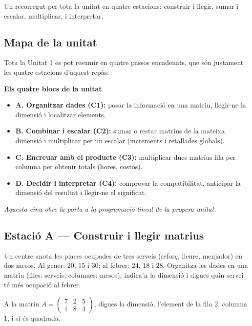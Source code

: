 %
{Un recorregut per tota la unitat en quatre estacions: construir i llegir, sumar i escalar, multiplicar, i interpretar.}

\subsection{Mapa de la unitat}

Tota la Unitat 1 es pot resumir en quatre passos encadenats, que són justament les
quatre estacions d'aquest repàs:

\begin{idea}
\textbf{Els quatre blocs de la unitat}
\begin{itemize}[leftmargin=1.4em, itemsep=2pt]
  \item \textbf{A. Organitzar dades (C1):} posar la informació en una matriu,
        llegir-ne la dimensió i localitzar elements.
  \item \textbf{B. Combinar i escalar (C2):} sumar o restar matrius de la mateixa
        dimensió i multiplicar per un escalar (increments i retallades globals).
  \item \textbf{C. Encreuar amb el producte (C3):} multiplicar dues matrius fila
        per columna per obtenir totals (hores, costos).
  \item \textbf{D. Decidir i interpretar (C4):} comprovar la compatibilitat,
        anticipar la dimensió del resultat i llegir-ne el significat.
\end{itemize}
\textit{Aquesta eina obre la porta a la programació lineal de la propera unitat.}
\end{idea}

\subsection{Estació A — Construir i llegir matrius}

\begin{exercicis}[Estació A]
\begin{exlist}
  \item Un centre anota les places ocupades de tres serveis (reforç, lleure,
        menjador) en dos mesos. Al gener: $20$, $15$ i $30$; al febrer: $24$, $18$
        i $28$. Organitza les dades en una matriu (files: serveis; columnes: mesos),
        indica'n la dimensió i digues quin servei té més ocupació al febrer.
  \item A la matriu $A=\begin{pmatrix} 7 & 2 & 5 \\ 1 & 8 & 4 \end{pmatrix}$,
        digues la dimensió, l'element de la fila 2, columna 1, i si és quadrada.
\end{exlist}
\end{exercicis}

